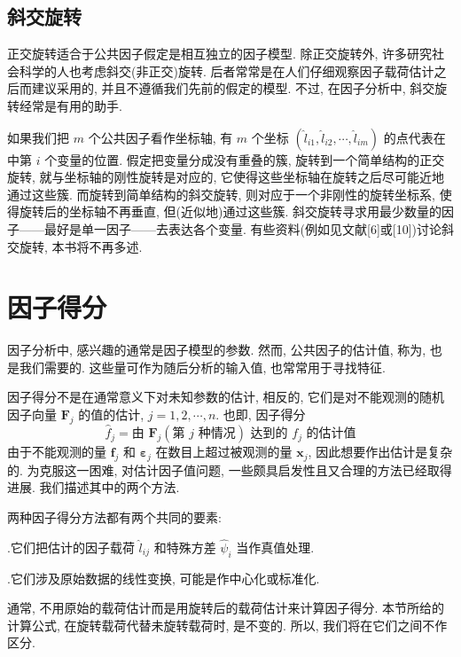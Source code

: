 
\subsection*{斜交旋转}

正交旋转适合于公共因子假定是相互独立的因子模型. 除正交旋转外, 许多研究社会科学的人也考虑斜交(非正交)旋转. 后者常常是在人们仔细观察因子载荷估计之后而建议采用的, 并且不遵循我们先前的假定的模型. 不过, 在因子分析中, 斜交旋转经常是有用的助手.

如果我们把 $m$ 个公共因子看作坐标轴, 有 $m$ 个坐标 $(\hat{l}_{i1},\hat{l}_{i2},\cdots,\hat{l}_{im})$ 的点代表在中第 $i$ 个变量的位置. 假定把变量分成没有重叠的簇, 旋转到一个简单结构的正交旋转, 就与坐标轴的刚性旋转是对应的, 它使得这些坐标轴在旋转之后尽可能近地通过这些簇. 而旋转到简单结构的斜交旋转, 则对应于一个非刚性的旋转坐标系, 使得旋转后的坐标轴不再垂直, 但(近似地)通过这些簇. 斜交旋转寻求用最少数量的因子——最好是单一因子——去表达各个变量. 有些资料(例如见文献[6]或[10])讨论斜交旋转, 本书将不再多述.

\section{因子得分}
\label{sec:9.5}

因子分析中, 感兴趣的通常是因子模型的参数. 然而, 公共因子的估计值, 称为, 也是我们需要的. 这些量可作为随后分析的输入值, 也常常用于寻找特征.

因子得分不是在通常意义下对未知参数的估计, 相反的, 它们是对不能观测的随机因子向量 $\mathbf{F}_j$ 的值的估计, $j=1,2,\cdots,n$. 也即, 因子得分
\[
\hat{f}_j=\text{由 } \mathbf{F}_j(\text{第 } j \text{ 种情况})\text{ 达到的 } f_j \text{ 的估计值}
\]
由于不能观测的量 $\mathbf{f}_j$ 和 $\boldsymbol{\varepsilon}_j$ 在数目上超过被观测的量 $\mathbf{x}_j$, 因此想要作出估计是复杂的. 为克服这一困难, 对估计因子值问题, 一些颇具启发性且又合理的方法已经取得进展. 我们描述其中的两个方法.

两种因子得分方法都有两个共同的要素:

.\quad 它们把估计的因子载荷 $\hat{l}_{ij}$ 和特殊方差 $\hat{\psi}_i$ 当作真值处理.

.\quad 它们涉及原始数据的线性变换, 可能是作中心化或标准化.

通常, 不用原始的载荷估计而是用旋转后的载荷估计来计算因子得分. 本节所给的计算公式, 在旋转载荷代替未旋转载荷时, 是不变的. 所以, 我们将在它们之间不作区分.

